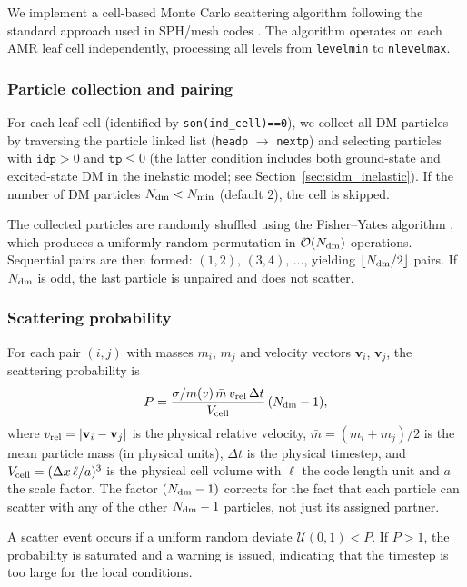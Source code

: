\documentclass[fleqn,usenatbib]{mnras}
\newcommand{\code}[1]{\texttt{#1}}
\newcommand{\vrel}{v_{\rm rel}}
\newcommand{\sigmam}{\sigma/m}
\begin{document}
We implement a cell-based Monte Carlo scattering algorithm following
the standard approach used in SPH/mesh codes
\citep{Rocha2013,Robertson2017,Banerjee2020}.  The algorithm operates
on each AMR leaf cell independently, processing all levels from
\code{levelmin} to \code{nlevelmax}.

\subsubsection{Particle collection and pairing}

For each leaf cell (identified by \code{son(ind\_cell)==0}), we
collect all DM particles by traversing the particle linked list
(\code{headp} $\to$ \code{nextp}) and selecting particles with
$\code{idp}>0$ and $\code{tp}\le 0$ (the latter condition includes
both ground-state and excited-state DM in the inelastic model;
see Section~\ref{sec:sidm_inelastic}).  If the number of DM particles
$N_{\rm dm} < N_{\rm min}$ (default 2), the cell is skipped.

The collected particles are randomly shuffled using the Fisher--Yates
algorithm \citep{Knuth1997}, which produces a uniformly random
permutation in $\mathcal{O}(N_{\rm dm})$ operations.  Sequential
pairs are then formed: $(1,2),\,(3,4),\,\ldots$, yielding
$\lfloor N_{\rm dm}/2 \rfloor$ pairs.  If $N_{\rm dm}$ is odd, the
last particle is unpaired and does not scatter.

\subsubsection{Scattering probability}

For each pair $(i,j)$ with masses $m_i$, $m_j$ and velocity vectors
$\mathbf{v}_i$, $\mathbf{v}_j$, the scattering probability is
\begin{equation}
P = \frac{\sigmam(v)\,\bar{m}\,\vrel\,\Delta t}
         {V_{\rm cell}}\,(N_{\rm dm} - 1),
\label{eq:scatter_prob}
\end{equation}
where $\vrel = |\mathbf{v}_i - \mathbf{v}_j|$ is the physical
relative velocity,
$\bar{m} = (m_i + m_j)/2$ is the mean particle mass (in physical
units), $\Delta t$ is the physical timestep, and
$V_{\rm cell} = (\Delta x\,\ell/a)^3$ is the physical cell volume
with $\ell$ the code length unit and $a$ the scale factor.  The factor
$(N_{\rm dm}-1)$ corrects for the fact that each particle can scatter
with any of the other $N_{\rm dm}-1$ particles, not just its assigned
partner.

A scatter event occurs if a uniform random deviate $\mathcal{U}(0,1)
< P$.  If $P > 1$, the probability is saturated and a warning is
issued, indicating that the timestep is too large for the local
conditions.
\end{document}
